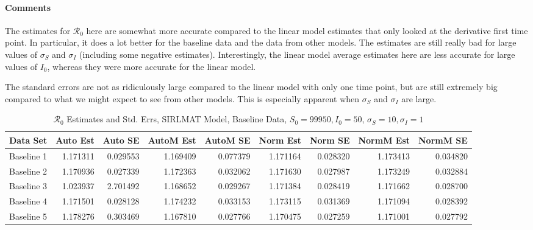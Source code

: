 \documentclass[12pt]{article}
\newcommand{\rr}{\ensuremath{\mathcal{R}_0}}
\begin{document}
\paragraph{Comments}

The estimates for $\rr$ here are somewhat more accurate compared to the linear model estimates that only looked at the derivative first time point. In particular, it does a lot better for the baseline data and the data from other models. The estimates are still really bad for large values of $\sigma_S$ and $\sigma_I$ (including some negative estimates). Interestingly, the linear model average estimates here are less accurate for large values of $I_0$, whereas they were more accurate for the linear model.

The standard errors are not as ridiculously large compared to the linear model with only one time point, but are still extremely big compared to what we might expect to see from other models. This is especially apparent when $\sigma_S$ and $\sigma_I$ are large.

\begin{table}[H]
	
	\caption{$\rr$ Estimates and Std. Errs, SIRLMAT Model,
		Baseline Data, $S_0 = 99950, I_0 = 50$, 
		$\sigma_S = 10, \sigma_I = 1$}
	\begin{footnotesize}
		\hskip -1cm
	\begin{tabular}{l|r|r|r|r|r|r|r|r}
		\hline
		Data Set & Auto Est & Auto SE & AutoM Est & AutoM SE & Norm Est & Norm SE & NormM Est & NormM SE\\
		\hline
		Baseline 1 & 1.171311 & 0.029553 & 1.169409 & 0.077379 & 1.171164 & 0.028320 & 1.173413 & 0.034820\\
		\hline
		Baseline 2 & 1.170936 & 0.027339 & 1.172363 & 0.032062 & 1.171630 & 0.027987 & 1.173249 & 0.032884\\
		\hline
		Baseline 3 & 1.023937 & 2.701492 & 1.168652 & 0.029267 & 1.171384 & 0.028419 & 1.171662 & 0.028700\\
		\hline
		Baseline 4 & 1.171501 & 0.028128 & 1.174232 & 0.033153 & 1.173115 & 0.031369 & 1.171094 & 0.028392\\
		\hline
		Baseline 5 & 1.178276 & 0.303469 & 1.167810 & 0.027766 & 1.170475 & 0.027259 & 1.171001 & 0.027792\\
		\hline
	\end{tabular}
\end{footnotesize}
\end{table}
\end{document}
